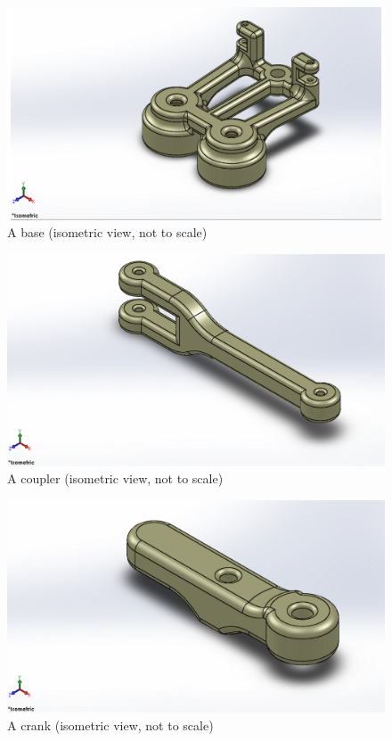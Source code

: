 \begin{appendix}
\begin{figure}
\centering
\includegraphics[width=\textwidth]{Files/Figures/base.png}
\caption{A base (isometric view, not to scale)}
\label{fig:base}
\end{figure}

\begin{figure}
\centering
\includegraphics[width=\textwidth]{Files/Figures/coupler.png}
\caption{A coupler (isometric view, not to scale)}
\label{fig:coupler}
\end{figure}

\begin{figure}
\centering
\includegraphics[width=\textwidth]{Files/Figures/crank.png}
\caption{A crank (isometric view, not to scale)}
\label{fig:crank}
\end{figure}


\end{appendix}
